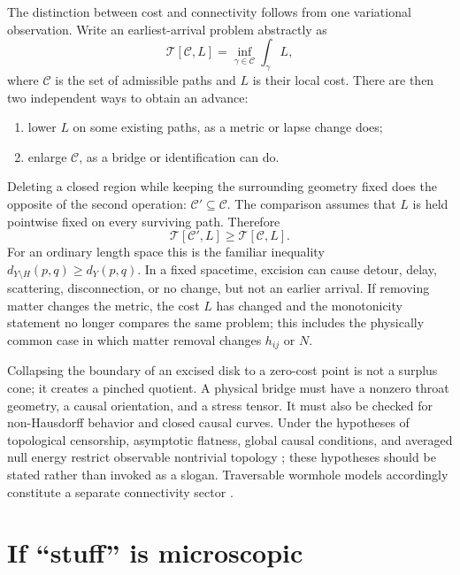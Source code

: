 \documentclass[aps,prd,twocolumn,amsmath,amssymb,nofootinbib]{revtex4-2}
\begin{document}
The distinction between cost and connectivity follows from one variational
observation.  Write an earliest-arrival problem abstractly as
\begin{equation}
 \mathcal T[\mathcal C,L]
 =\inf_{\gamma\in\mathcal C}\int_{\gamma}L,
 \label{eq:abstractcost}
\end{equation}
where $\mathcal C$ is the set of admissible paths and $L$ is their local cost.
There are then two independent ways to obtain an advance:
\begin{enumerate}
 \item lower $L$ on some existing paths, as a metric or lapse change does;
 \item enlarge $\mathcal C$, as a bridge or identification can do.
\end{enumerate}

Deleting a closed region while keeping the surrounding geometry fixed does
the opposite of the second operation: $\mathcal C'\subseteq\mathcal C$.
The comparison assumes that $L$ is held pointwise fixed on every surviving
path.  Therefore
\begin{equation}
 \mathcal T[\mathcal C',L]\geq
 \mathcal T[\mathcal C,L].
 \label{eq:deletionmonotonicity}
\end{equation}
For an ordinary length space this is the familiar inequality
$d_{Y\setminus H}(p,q)\geq d_Y(p,q)$.  In a fixed spacetime, excision can cause
detour, delay, scattering, disconnection, or no change, but not an earlier
arrival.  If removing matter changes the metric, the cost $L$ has changed and
the monotonicity statement no longer compares the same problem; this includes
the physically common case in which matter removal changes $h_{ij}$ or $N$.

Collapsing the boundary of an excised disk to a zero-cost point is not a
surplus cone; it creates a pinched quotient.  A physical bridge must have a
nonzero throat geometry, a causal orientation, and a stress tensor.  It must
also be checked for non-Hausdorff behavior and closed causal curves.  Under
the hypotheses of topological censorship, asymptotic flatness, global causal
conditions, and averaged null energy restrict observable nontrivial topology
\cite{friedman-schleich-witt-1993}; these hypotheses should be stated rather
than invoked as a slogan.  Traversable wormhole models accordingly constitute
a separate connectivity sector \cite{visser-1995}.

\section{If ``stuff'' is microscopic}
\label{sec:microscopic}
\end{document}
